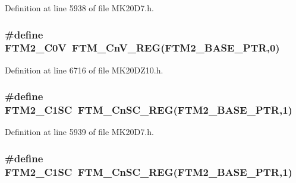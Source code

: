 Definition at line 5938 of file M\+K20\+D7.\+h.

\subsubsection[{\texorpdfstring{F\+T\+M2\+\_\+\+C0V}{FTM2_C0V}}]{\setlength{\rightskip}{0pt plus 5cm}\#define F\+T\+M2\+\_\+\+C0V~{\bf F\+T\+M\+\_\+\+Cn\+V\+\_\+\+R\+EG}({\bf F\+T\+M2\+\_\+\+B\+A\+S\+E\+\_\+\+P\+TR},0)}\hypertarget{group___f_t_m___register___accessor___macros_ga92b3a29332163807bb6ae240cfa2e4aa}{}\label{group___f_t_m___register___accessor___macros_ga92b3a29332163807bb6ae240cfa2e4aa}


Definition at line 6716 of file M\+K20\+D\+Z10.\+h.

\subsubsection[{\texorpdfstring{F\+T\+M2\+\_\+\+C1\+SC}{FTM2_C1SC}}]{\setlength{\rightskip}{0pt plus 5cm}\#define F\+T\+M2\+\_\+\+C1\+SC~{\bf F\+T\+M\+\_\+\+Cn\+S\+C\+\_\+\+R\+EG}({\bf F\+T\+M2\+\_\+\+B\+A\+S\+E\+\_\+\+P\+TR},1)}\hypertarget{group___f_t_m___register___accessor___macros_gae00fff26b9421f4023842bf031c833b4}{}\label{group___f_t_m___register___accessor___macros_gae00fff26b9421f4023842bf031c833b4}


Definition at line 5939 of file M\+K20\+D7.\+h.

\subsubsection[{\texorpdfstring{F\+T\+M2\+\_\+\+C1\+SC}{FTM2_C1SC}}]{\setlength{\rightskip}{0pt plus 5cm}\#define F\+T\+M2\+\_\+\+C1\+SC~{\bf F\+T\+M\+\_\+\+Cn\+S\+C\+\_\+\+R\+EG}({\bf F\+T\+M2\+\_\+\+B\+A\+S\+E\+\_\+\+P\+TR},1)}\hypertarget{group___f_t_m___register___accessor___macros_gae00fff26b9421f4023842bf031c833b4}{}\label{group___f_t_m___register___accessor___macros_gae00fff26b9421f4023842bf031c833b4}


